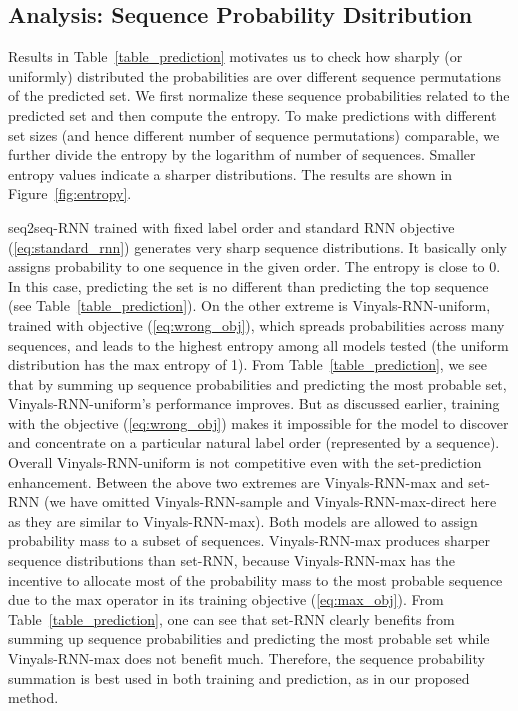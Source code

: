 \subsection{Analysis: Sequence Probability Dsitribution}
Results in Table~\ref{table_prediction} motivates us to check how sharply (or uniformly) distributed the probabilities are over different sequence permutations of the predicted set. We first normalize these sequence probabilities related to the predicted set and then compute the entropy. To make predictions with different set sizes (and hence different number of sequence permutations) comparable, we further divide the entropy by the logarithm of number of sequences. Smaller entropy values indicate a sharper distributions. The results are shown in Figure~\ref{fig:entropy}.

seq2seq-RNN trained with fixed label order and standard RNN objective (\ref{eq:standard_rnn}) generates very sharp sequence distributions. It basically only assigns probability to one sequence in the given order. The entropy is close to 0. In this case, predicting the set is no different than predicting the top sequence (see Table~\ref{table_prediction}). On the other extreme is Vinyals-RNN-uniform, trained with objective (\ref{eq:wrong_obj}), which spreads probabilities across many sequences, and leads to the highest entropy among all models tested (the uniform distribution has the max entropy of 1). From Table~\ref{table_prediction}, we see that by summing up sequence probabilities and predicting the most probable set, Vinyals-RNN-uniform's performance improves. But as discussed earlier, training with the objective (\ref{eq:wrong_obj}) makes it impossible for the model to discover and concentrate on a particular natural label order (represented by a sequence). Overall Vinyals-RNN-uniform is not competitive even with the set-prediction enhancement. Between the above two extremes are Vinyals-RNN-max and set-RNN (we have omitted Vinyals-RNN-sample and Vinyals-RNN-max-direct here as they are similar to Vinyals-RNN-max). Both models are allowed to assign probability mass to a subset of sequences. Vinyals-RNN-max produces sharper sequence distributions than set-RNN, because Vinyals-RNN-max has the incentive to allocate most of the probability mass to the most probable sequence due to the max operator in its training objective (\ref{eq:max_obj}). From Table~\ref{table_prediction}, one can see that set-RNN clearly benefits from summing up sequence probabilities and predicting the most probable set while Vinyals-RNN-max does not benefit much. Therefore, the sequence probability summation is best used in both training and prediction, as in our proposed method.

